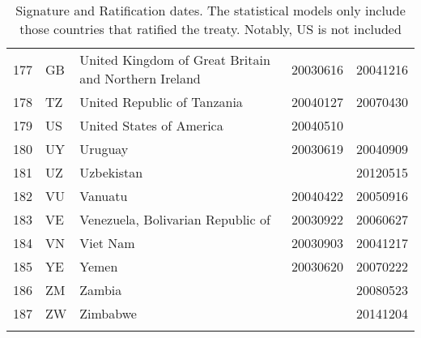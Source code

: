 \begin{longtable}{rllrr}
  177 & GB & United Kingdom of Great Britain and Northern Ireland & 20030616 & 20041216 \\ 
  178 & TZ & United Republic of Tanzania & 20040127 & 20070430 \\ 
  179 & US & United States of America & 20040510 &  \\ 
  180 & UY & Uruguay & 20030619 & 20040909 \\ 
  181 & UZ & Uzbekistan &  & 20120515 \\ 
  182 & VU & Vanuatu & 20040422 & 20050916 \\ 
  183 & VE & Venezuela, Bolivarian Republic of & 20030922 & 20060627 \\ 
  184 & VN & Viet Nam & 20030903 & 20041217 \\ 
  185 & YE & Yemen & 20030620 & 20070222 \\ 
  186 & ZM & Zambia &  & 20080523 \\ 
  187 & ZW & Zimbabwe &  & 20141204 \\ 
   \bottomrule
\caption{Signature and Ratification dates. The statistical models only include those countries that ratified the treaty. Notably, US is not included} 
\end{longtable}
